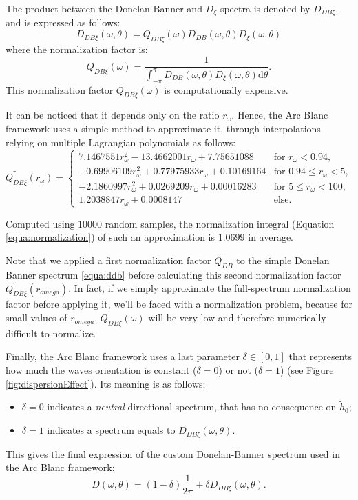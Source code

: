 \documentclass[final]{jcgt}
\def\framework{the Arc Blanc framework\xspace}
\begin{document}
The product between the Donelan-Banner and $D_{\xi}$ spectra is denoted by $D_{DB\xi}$, and is expressed as follows:
\begin{equation}
	D_{DB\xi}(\omega, \theta) =Q_{DB\xi}(\omega) D_{DB}(\omega, \theta) D_{\xi}(\omega, \theta)
\end{equation}
where the normalization factor is:
\begin{equation}
	Q_{DB\xi}(\omega)=\frac{1}{\displaystyle\int_{-\pi}^\pi D_{DB}(\omega, \theta) D_{\xi}(\omega, \theta) \mathrm{d} \theta}.
\end{equation}
This normalization factor $Q_{DB\xi}(\omega)$ is computationally expensive.

It can be noticed that it depends only on the ratio $r_{\omega}$.
Hence, \framework uses a simple method to approximate it, through interpolations relying on multiple Lagrangian polynomials as follows:
\begin{equation}
	\widetilde{Q_{DB\xi}}(r_{\omega})=
	\begin{cases}
		7.1467551 r_{\omega}^2 - 13.4662001 r_{\omega} + 7.75651088    & \text{for }r_{\omega} < 0.94,        \\
		- 0.69906109 r_{\omega}^2 + 0.77975933 r_{\omega} + 0.10169164 & \text{for }0.94 \leq r_{\omega} < 5, \\
		- 2.1860997 r_{\omega}^2 +0.0269209 r_{\omega} +0.00016283     & \text{for } 5 \leq r_{\omega} < 100, \\
		1.2038847 r_{\omega} + 0.0008147                               & \text{else.}
	\end{cases}
\end{equation}

Computed using $10000$ random samples, the normalization integral (Equation \ref{equa:normalization}) of such an approximation is $1.0699$ in average.

Note that we applied a first normalization factor $Q_{DB}$ to the simple Donelan Banner spectrum \ref{equa:ddb} before calculating this second normalization factor $\widetilde{Q_{DB\xi}}(r_{omega})$. In fact, if we simply approximate the full-spectrum normalization factor before applying it, we'll be faced with a normalization problem, because for small values of $r_{omega}$, $Q_{DB\xi}(\omega)$ will be very low and therefore numerically difficult to normalize.

Finally, \framework uses a last parameter $\delta\in[0,1]$ that represents how much the waves orientation is constant ($\delta = 0$) or not ($\delta = 1$) (see Figure \ref{fig:dispersionEffect}).
Its meaning is as follows:
\begin{itemize}
	\item $\delta = 0$ indicates a \emph{neutral} directional spectrum, that has no consequence on $\tilde{h}_0$;
	\item $\delta=1$ indicates a spectrum equals to $D_{DB\xi}(\omega, \theta)$.
\end{itemize}
This gives the final expression of the custom Donelan-Banner spectrum used in \framework:
\begin{equation}
	D(\omega, \theta)=\left(1-\delta\right)\frac{1}{2\pi}+\delta D_{DB\xi}(\omega,\theta).
\end{equation}
\end{document}
